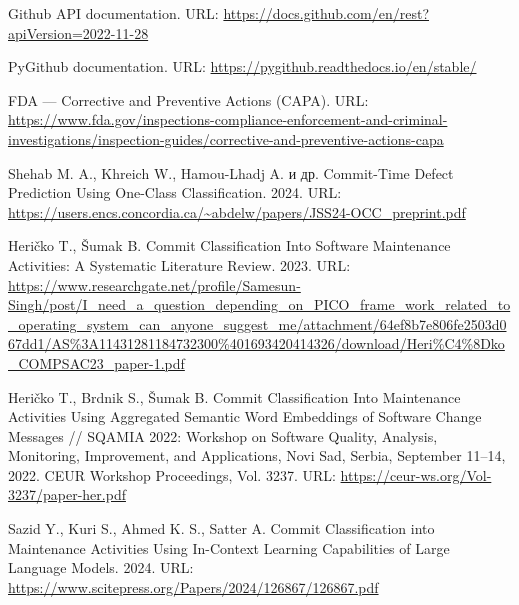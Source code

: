 \begin{thebibliography}{99}
	\label{GithubAPI}
	Github API documentation.  
	URL: \url{https://docs.github.com/en/rest?apiVersion=2022-11-28}
	
	\label{PyGithub}
	PyGithub documentation.  
	URL: \url{https://pygithub.readthedocs.io/en/stable/}
	
	\label{FDA}
	FDA — Corrective and Preventive Actions (CAPA).  
	URL: \url{https://www.fda.gov/inspections-compliance-enforcement-and-criminal-investigations/inspection-guides/corrective-and-preventive-actions-capa}
	
	\label{One-Class}
	Shehab M. A., Khreich W., Hamou-Lhadj A. и др.  
	Commit-Time Defect Prediction Using One-Class Classification. 2024.  
	URL: \url{https://users.encs.concordia.ca/~abdelw/papers/JSS24-OCC_preprint.pdf}
	
	\label{Commit-classification}
	Heričko T., Šumak B.  
	Commit Classification Into Software Maintenance Activities: A Systematic Literature Review. 2023.  
	URL: \url{https://www.researchgate.net/profile/Samesun-Singh/post/I_need_a_question_depending_on_PICO_frame_work_related_to_operating_system_can_anyone_suggest_me/attachment/64ef8b7e806fe2503d067dd1/AS%3A11431281184732300%401693420414326/download/Heri%C4%8Dko_COMPSAC23_paper-1.pdf}
	
	\label{Hericko}
	Heričko T., Brdnik S., Šumak B. Commit Classification Into Maintenance Activities Using Aggregated Semantic Word Embeddings of Software Change Messages // SQAMIA 2022: Workshop on Software Quality, Analysis, Monitoring, Improvement, and Applications, Novi Sad, Serbia, September 11–14, 2022. CEUR Workshop Proceedings, Vol. 3237. URL: \url{https://ceur-ws.org/Vol-3237/paper-her.pdf}
	
	\label{Sazid}
	Sazid Y., Kuri S., Ahmed K. S., Satter A.  
	Commit Classification into Maintenance Activities Using In-Context Learning Capabilities of Large Language Models. 2024.  
	URL: \url{https://www.scitepress.org/Papers/2024/126867/126867.pdf}
	
\end{thebibliography}
